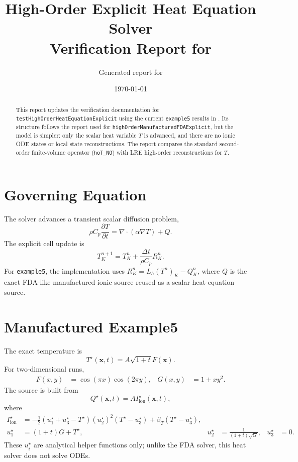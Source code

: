 \documentclass[11pt,a4paper]{article}
\title{High-Order Explicit Heat Equation Solver\\Verification Report for \code{example5}}
\author{Generated report for \code{testHighOrderHeatEquationExplicit}}
\date{\today}
\newcommand{\code}[1]{\texttt{#1}}
\begin{document}
\maketitle
\begin{abstract}
This report updates the verification documentation for \code{testHighOrderHeatEquationExplicit} using the current \code{example5} results in . Its structure follows the report used for \code{highOrderManufacturedFDAExplicit}, but the model is simpler: only the scalar heat variable $T$ is advanced, and there are no ionic ODE states or local state reconstructions. The report compares the standard second-order finite-volume operator (\code{hoT\_NO}) with LRE high-order reconstructions for $T$.
\end{abstract}
\section{Governing Equation}
The solver advances a transient scalar diffusion problem,
\begin{equation}
\rho C_p\frac{\partial T}{\partial t} = \nabla\cdot(\alpha\nabla T) + Q.
\end{equation}
The explicit cell update is
\begin{equation}
T_K^{n+1} = T_K^n + \frac{\Delta t}{\rho C_p}R_K^n.
\end{equation}
For \code{example5}, the implementation uses $R_K^n=L_h(T^n)_K-Q_K^n$, where $Q$ is the exact FDA-like manufactured ionic source reused as a scalar heat-equation source.
\section{Manufactured Example5}
The exact temperature is
\begin{equation}
T^\star(\mathbf{x},t)=A\sqrt{1+t}F(\mathbf{x}).
\end{equation}
For two-dimensional runs,
\begin{align}
F(x,y)&=\cos(\pi x)\cos(2\pi y), & G(x,y)&=1+xy^2.
\end{align}
The source is built from
\begin{equation}
Q^\star(\mathbf{x},t)=A I_{\mathrm{ion}}^\star(\mathbf{x},t),
\end{equation}
where
\begin{align}
I_{\mathrm{ion}}^\star &= -\frac12\left(u_1^\star+u_3^\star-T^\star\right)(u_2^\star)^2\left(T^\star-u_3^\star\right)+\beta_T\left(T^\star-u_3^\star\right),\\
u_1^\star&=(1+t)G+T^\star, & u_2^\star&=\frac{1}{(1+t)\sqrt{G}}, & u_3^\star&=0.
\end{align}
These $u_i^\star$ are analytical helper functions only; unlike the FDA solver, this heat solver does not solve ODEs.
\end{document}
